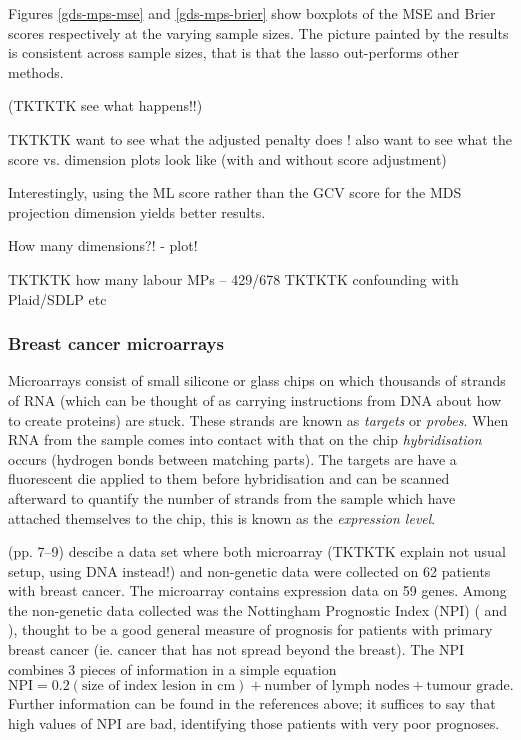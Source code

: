 Figures \ref{gds-mps-mse} and \ref{gds-mps-brier} show boxplots of the MSE and Brier scores respectively at the varying sample sizes. The picture painted by the results is consistent across sample sizes, that is that the lasso out-performs other methods.

(TKTKTK see what happens!!)

TKTKTK want to see what the adjusted penalty does !
      also want to see what the score vs. dimension plots look like (with and without score adjustment)


Interestingly, using the ML score rather than the GCV score for the MDS projection dimension yields better results.

How many dimensions?! - plot!


TKTKTK  how many labour MPs   -- 429/678
TKTKTK confounding with Plaid/SDLP etc






\subsubsection{Breast cancer microarrays}

Microarrays consist of small silicone or glass chips on which thousands of strands of RNA (which can be thought of as carrying instructions from DNA about how to create proteins) are stuck. These strands are known as \textit{targets} or \textit{probes}. When RNA from the sample comes into contact with that on the chip \textit{hybridisation} occurs (hydrogen bonds between matching parts). The targets are have a fluorescent die applied to them before hybridisation and can be scanned afterward to quantify the number of strands from the sample which have attached themselves to the chip, this is known as the \textit{expression level}.

\cite{ernstbook} (pp. 7--9) descibe a data set where both microarray (TKTKTK explain not usual setup, using DNA instead!) and non-genetic data were collected on 62 patients with breast cancer. The microarray contains expression data on 59 genes. Among the non-genetic data collected was the Nottingham Prognostic Index (NPI) (\cite{Haybittle1982} and \cite{Todd1987}), thought to be a good general measure of prognosis for patients with primary breast cancer (ie. cancer that has not spread beyond the breast). The NPI combines 3 pieces of information in a simple equation
\begin{equation}
\text{NPI} = 0.2(\text{size of index lesion in cm}) + \text{number of lymph nodes} + \text{tumour grade}.
\end{equation}
Further information can be found in the references above; it suffices to say that high values of NPI are bad, identifying those patients with very poor prognoses.


